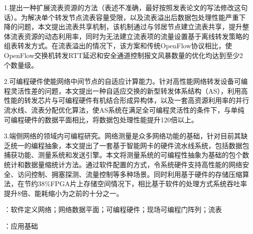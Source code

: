 1.提出一种扩展流表资源的方法（表述不准确，最好按照发表论文的写法修改这句话）。为解决单个转发节点流表容量受限，以及流表溢出后数据包处理性能严重下降的问题，本文提出流表共享机制，该机制通过与邻居节点建立流表共享，提升整体流表资源的动态利用率，同时为无法建立流表项的流量设置基于离线转发策略的组表转发方式。在流表溢出的情况下，该方案和传统OpenFlow协议相比，使OpenFlow交换机转发RTT延迟和安全通道控制报文风暴数量的优化均达到至少2个数量级。

2.可编程硬件使能网络中间节点的自适应计算能力。针对高性能网络转发设备可编程灵活性差的问题，本文提出一种自适应交换的新型转发体系结构（AS），利用高性能的转发芯片与可编程硬件有机结合形成异构体，以及一套高资源利用率的并行流水线、流表分配优化算法，使AS系统在满足全可编程灵活性的条件下，与单纯可编程硬件的数据平面相比，将数据包处理性能提升120倍以上。

3.端侧网络的领域内可编程研究。网络测量是众多网络功能的基础，针对目前其缺乏统一的编程抽象，本文提出了一套基于智能网卡的硬件流水线系统，包括数据包捕获功能、测量系统和发送引擎。本文将测量系统的可编程性抽象为基础的包个数统计和数据量缩统计方法。通过软件配置的方式，令系统硬件支持高性能的网络安全、访问控制、拥塞探测、流量控制等多种场景。同时利用基于硬件的存储压缩算法，在节约38\%FPGA片上存储空间情况下，相比基于软件的处理方式系统吞吐率提升8倍、能耗缩小为之前的十分之一。




{\boldsong}
\vspace{\baselineskip}
：软件定义网络；网络数据平面；可编程硬件；现场可编程门阵列；流表

\vspace{\baselineskip}
：应用基础

